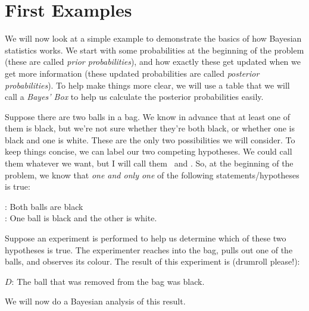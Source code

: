 \chapter{First Examples}
We will now look at a simple example to demonstrate the basics of how Bayesian
statistics works. We start with some probabilities at the beginning of the problem (these are
called {\it prior probabilities}), and how exactly these get updated
when we get more information (these updated probabilities are called
{\it posterior probabilities}). To help make things more clear, we will
use a table that we will call a {\it Bayes' Box} to help us calculate the
posterior probabilities easily.

Suppose there are two balls in a bag. We know in advance
that at least one of them is black, but we're not sure whether they're both
black, or whether one is black and one is white. These are the only two
possibilities we will consider.
To keep things concise, we
can label our two competing hypotheses. We could call them whatever we want,
but I will call them \bb~and \bw. So, at the beginning of the problem, we know
that {\it one and only one} of the following statements/hypotheses is true:\\
\begin{framed}
\bb: Both balls are black\\
\bw: One ball is black and the other is white.
\end{framed}
Suppose an experiment is performed to help us determine
which of these two hypotheses is
true. The experimenter reaches into the bag, pulls out one of the balls, and
observes its colour. The result of this experiment is (drumroll please!):
\begin{framed}
$D$: The ball that was removed from the bag was black.
\end{framed}
We will now do a Bayesian analysis of this result.

